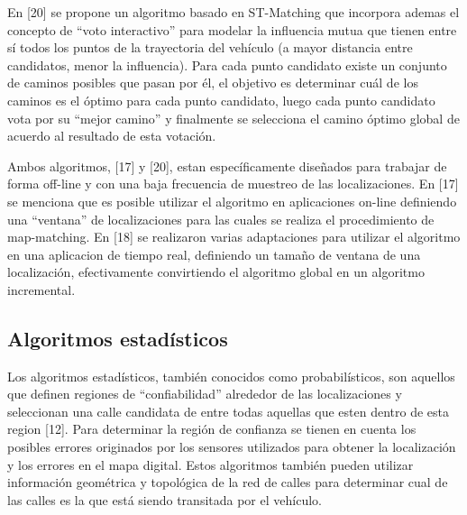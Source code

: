 En [20] se propone un algoritmo basado en ST-Matching que incorpora ademas el concepto de “voto interactivo” para modelar la influencia mutua que tienen entre sí todos los puntos de la trayectoria del vehículo (a mayor distancia entre candidatos, menor la influencia). Para cada punto candidato existe un conjunto de caminos posibles que pasan por él, el objetivo es determinar cuál de los caminos es el óptimo para cada punto candidato, luego cada punto candidato vota por su “mejor camino” y finalmente se selecciona el camino óptimo global de acuerdo al resultado de esta votación.

Ambos algoritmos, [17] y [20], estan específicamente diseñados para trabajar de forma off-line y con una baja frecuencia de muestreo de las localizaciones. En [17] se  menciona que es posible utilizar el algoritmo en aplicaciones on-line definiendo una “ventana” de localizaciones para las cuales se realiza el procedimiento de map-matching. En [18] se realizaron varias adaptaciones para utilizar el algoritmo en una aplicacion de tiempo real, definiendo un tamaño de ventana de una localización, efectivamente convirtiendo el algoritmo global en un algoritmo incremental.

\subsection{Algoritmos estadísticos}

Los algoritmos estadísticos, también conocidos como probabilísticos, son aquellos que definen regiones de “confiabilidad” alrededor de las localizaciones y seleccionan una calle candidata de entre todas aquellas que esten dentro de esta region [12]. Para determinar la región de confianza se tienen en cuenta los posibles errores originados por los sensores utilizados para obtener la localización y los errores en el mapa digital. Estos algoritmos también pueden utilizar información geométrica y topológica de la red de calles para determinar cual de las calles es la que está siendo transitada por el vehículo.

